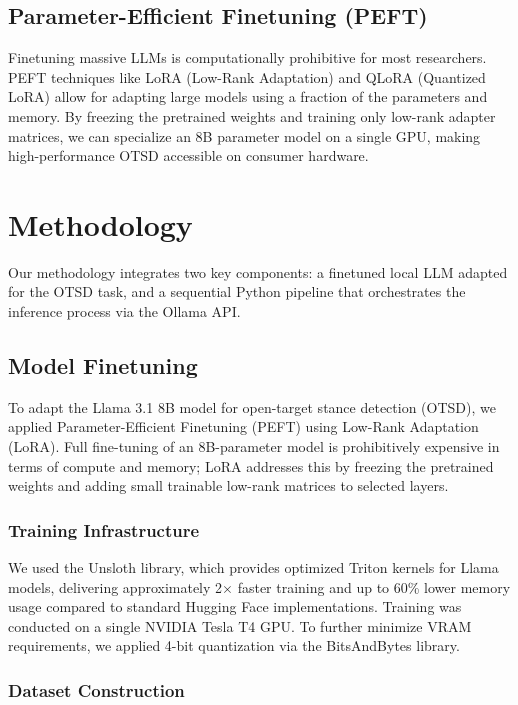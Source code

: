 \documentclass[conference]{IEEEtran}
\begin{document}
\subsection{Parameter-Efficient Finetuning (PEFT)}
Finetuning massive LLMs is computationally prohibitive for most researchers. PEFT techniques like LoRA (Low-Rank Adaptation) and QLoRA (Quantized LoRA) allow for adapting large models using a fraction of the parameters and memory. By freezing the pretrained weights and training only low-rank adapter matrices, we can specialize an 8B parameter model on a single GPU, making high-performance OTSD accessible on consumer hardware.

\section{Methodology}

Our methodology integrates two key components: a finetuned local LLM adapted for the OTSD task, and a sequential Python pipeline that orchestrates the inference process via the Ollama API.

\subsection{Model Finetuning}

To adapt the Llama 3.1 8B model for open-target stance detection (OTSD), we applied Parameter-Efficient Finetuning (PEFT) using Low-Rank Adaptation (LoRA). Full fine-tuning of an 8B-parameter model is prohibitively expensive in terms of compute and memory; LoRA addresses this by freezing the pretrained weights and adding small trainable low-rank matrices to selected layers.

\subsubsection{Training Infrastructure}

We used the Unsloth library, which provides optimized Triton kernels for Llama models, delivering approximately 2$\times$ faster training and up to 60\% lower memory usage compared to standard Hugging Face implementations. Training was conducted on a single NVIDIA Tesla T4 GPU. To further minimize VRAM requirements, we applied 4-bit quantization via the BitsAndBytes library.

\subsubsection{Dataset Construction}
\end{document}
